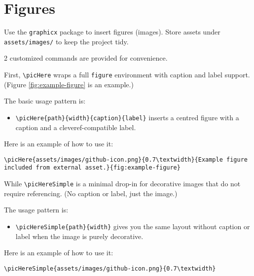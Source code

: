 \newpage
\section{Figures}

Use the \texttt{graphicx} package to insert figures (images). Store assets under \texttt{assets/images/} to keep the project tidy.

2 customized commands are provided for convenience. 

First, \texttt{\textbackslash picHere} wraps a full \texttt{figure} environment with caption and label support. (Figure \ref{fig:example-figure} is an example.)

The basic usage pattern is:

\begin{itemize}
  \item \texttt{\textbackslash picHere\{path\}\{width\}\{caption\}\{label\}} inserts a centred figure with a caption and a cleveref-compatible label.
\end{itemize}

Here is an example of how to use it:

\begin{lstlisting}[style=githubLight, language={[LaTeX]TeX}, caption={Using the figure helpers in a listing block.}, label={lst:figure-helper-macros}]
\picHere{assets/images/github-icon.png}{0.7\textwidth}{Example figure included from external asset.}{fig:example-figure}
\end{lstlisting}


While \texttt{\textbackslash picHereSimple} is a minimal drop-in for decorative images that do not require referencing. (No caption or label, just the image.)

The usage pattern is:

\begin{itemize}
  \item \texttt{\textbackslash picHereSimple\{path\}\{width\}} gives you the same layout without caption or label when the image is purely decorative.
\end{itemize}

Here is an example of how to use it:

\begin{lstlisting}[style=githubLight, language={[LaTeX]TeX}, caption={Using the figure helpers in a listing block.}, label={lst:figure-helper-macros}]
    \picHereSimple{assets/images/github-icon.png}{0.7\textwidth}
\end{lstlisting}

